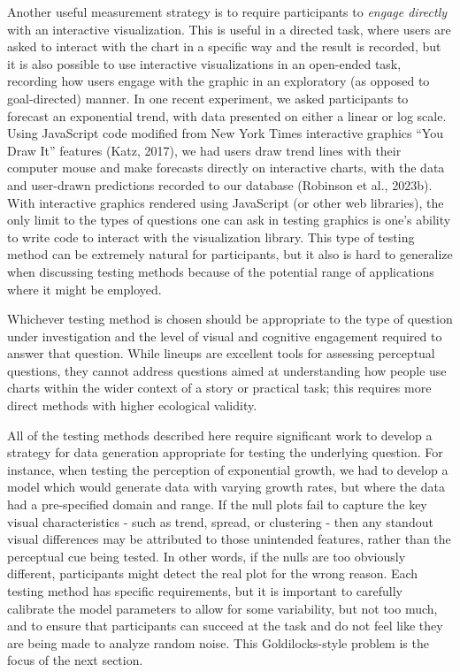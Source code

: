 \documentclass[
  10pt,
  letterpaper,
  DIV=11,
  numbers=noendperiod]{scrartcl}
\begin{document}
Another useful measurement strategy is to require participants to
\emph{engage directly} with an interactive visualization. This is useful
in a directed task, where users are asked to interact with the chart in
a specific way and the result is recorded, but it is also possible to
use interactive visualizations in an open-ended task, recording how
users engage with the graphic in an exploratory (as opposed to
goal-directed) manner. In one recent experiment, we asked participants
to forecast an exponential trend, with data presented on either a linear
or log scale. Using JavaScript code modified from New York Times
interactive graphics ``You Draw It'' features (Katz, 2017), we had users
draw trend lines with their computer mouse and make forecasts directly
on interactive charts, with the data and user-drawn predictions recorded
to our database (Robinson et al., 2023b). With interactive graphics
rendered using JavaScript (or other web libraries), the only limit to
the types of questions one can ask in testing graphics is one's ability
to write code to interact with the visualization library. This type of
testing method can be extremely natural for participants, but it also is
hard to generalize when discussing testing methods because of the
potential range of applications where it might be employed.

Whichever testing method is chosen should be appropriate to the type of
question under investigation and the level of visual and cognitive
engagement required to answer that question. While lineups are excellent
tools for assessing perceptual questions, they cannot address questions
aimed at understanding how people use charts within the wider context of
a story or practical task; this requires more direct methods with higher
ecological validity.

All of the testing methods described here require significant work to
develop a strategy for data generation appropriate for testing the
underlying question. For instance, when testing the perception of
exponential growth, we had to develop a model which would generate data
with varying growth rates, but where the data had a pre-specified domain
and range. If the null plots fail to capture the key visual
characteristics - such as trend, spread, or clustering - then any
standout visual differences may be attributed to those unintended
features, rather than the perceptual cue being tested. In other words,
if the nulls are too obviously different, participants might detect the
real plot for the wrong reason. Each testing method has specific
requirements, but it is important to carefully calibrate the model
parameters to allow for some variability, but not too much, and to
ensure that participants can succeed at the task and do not feel like
they are being made to analyze random noise. This Goldilocks-style
problem is the focus of the next section.
\end{document}
